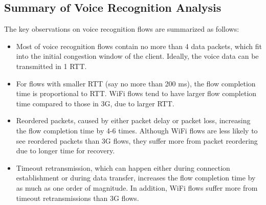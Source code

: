 \subsection{Summary of Voice Recognition Analysis}

The key observations on voice recognition flows are summarized as follows:
\begin{itemize}
\item Most of voice recognition flows contain no more than 4 data packets, which fit into the initial congestion window of the client. Ideally, the voice data can be transmitted in 1 RTT.
\item For flows with smaller RTT (say no more than 200 ms), the flow completion time is proportional to RTT. WiFi flows tend to have larger flow completion time compared to those in 3G, due to larger RTT. 	
\item Reordered packets, caused by either packet delay or packet loss, increasing the flow completion time by 4-6 times. Although WiFi flows are less likely to see reordered packets than 3G flows, they suffer more from packet reordering due to longer time for recovery.
\item Timeout retransmission, which can happen either during connection establishment or during data transfer, increases the flow completion time by as much as one order of magnitude. In addition, WiFi flows suffer more from timeout retransmissions than 3G flows.
\end{itemize}